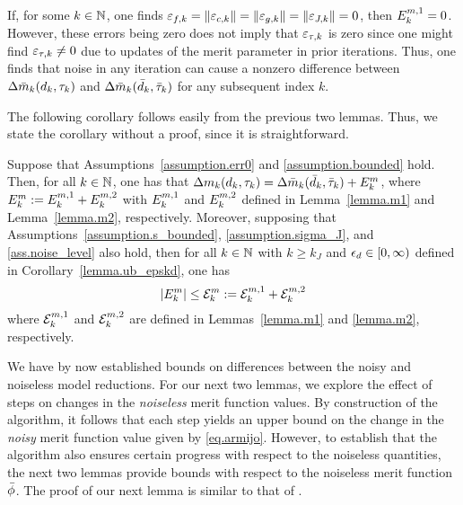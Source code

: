 \begin{remark}\label{rem.ugly_but_it_is_what_it_is}
  If, for some $k \in \mathbb{N}$, one finds $\varepsilon_{f,k} = \|\varepsilon_{c,k}\| = \|\varepsilon_{g,k}\| = \|\varepsilon_{J,k}\| = 0$, then $E_k^{m, 1} = 0$.  However, these errors being zero does not imply that $\varepsilon_{\tau,k}$ is zero since one might find $\varepsilon_{\tau,k} \neq 0$ due to updates of the merit parameter in prior iterations.  Thus, one finds that noise in any iteration can cause a nonzero difference between $\Delta {\bar m}_k (d_k, \tau_k)$ and $\Delta {\bar m}_k ({\bar d}_k, {\bar \tau}_k)$ for any subsequent index $k$.
\end{remark}

The following corollary follows easily from the previous two lemmas.  Thus, we state the corollary without a proof, since it is straightforward.

\begin{corollary}\label{cor.m}
  Suppose that Assumptions~\ref{assumption.err0} and \ref{assumption.bounded} hold.  Then, for all $k \in \mathbb{N}$, one has that $\Delta m_k(d_k, \tau_k) = \Delta {\bar m}_k({\bar d}_k, {\bar \tau}_k) + E_k^m$, where $E_k^m := E_k^{m, 1} + E_k^{m, 2}$ with $E_k^{m, 1}$ and $E_k^{m, 2}$ defined in Lemma~\ref{lemma.m1} and Lemma~\ref{lemma.m2}, respectively.  Moreover, supposing that Assumptions~\ref{assumption.s_bounded}, \ref{assumption.sigma_J}, and \ref{ass.noise_level} also hold, then for all $k \in \mathbb{N}$ with $k \geq k_J$ and $\epsilon_d \in [0,\infty)$ defined in Corollary~\ref{lemma.ub_epskd}, one has
  \begin{equation}\label{eq.m_bound}
    |E_k^m| \leq \mathcal{E}_k^m := \mathcal{E}_k^{m, 1}  + \mathcal{E}_k^{m, 2} 
  \end{equation}
  where $\mathcal{E}_k^{m, 1}$ and $\mathcal{E}_k^{m, 2}$ are defined in Lemmas~\ref{lemma.m1} and \ref{lemma.m2}, respectively.
\end{corollary}

We have by now established bounds on differences between the noisy and noiseless model reductions.  For our next two lemmas, we explore the effect of steps on changes in the \emph{noiseless} merit function values.  By construction of the algorithm, it follows that each step yields an upper bound on the change in the \emph{noisy} merit function value given by \eqref{eq.armijo}.  However, to establish that the algorithm also ensures certain progress with respect to the noiseless quantities, the next two lemmas provide bounds with respect to the noiseless merit function ${\bar \phi}$.  The proof of our next lemma is similar to that of \cite[Lemma 3.5]{CurtScheWaec10}.

